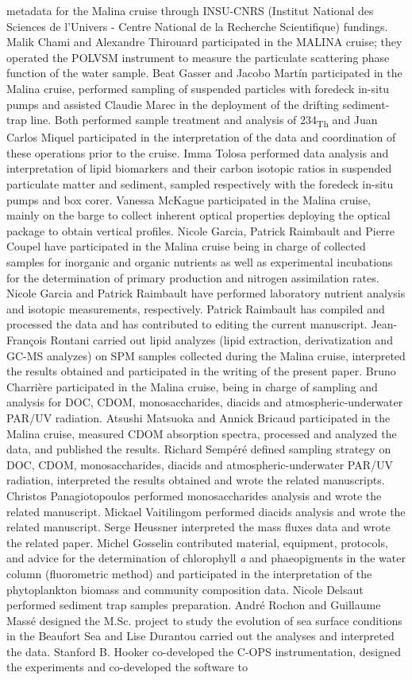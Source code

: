 \documentclass[essd, manuscript]{copernicus}
\begin{document}
{metadata for the Malina cruise through INSU-CNRS (Institut National des Sciences de l’Univers - Centre National de la Recherche Scientifique) fundings. Malik Chami and Alexandre Thirouard participated in the MALINA cruise; they operated the POLVSM instrument to measure the particulate scattering phase function of the water sample. Beat Gasser and Jacobo Martín participated in the Malina cruise, performed sampling of suspended particles with foredeck in-situ pumps and assisted Claudie Marec in the deployment of the drifting sediment-trap line. Both performed sample treatment and analysis of 234\textsubscript{Th} and Juan Carlos Miquel participated in the interpretation of the data and coordination of these  operations prior to the cruise. Imma Tolosa performed data analysis and interpretation of lipid biomarkers and their carbon isotopic ratios in suspended particulate matter and sediment, sampled respectively with the foredeck in-situ pumps and box corer. Vanessa McKague participated in the Malina cruise, mainly on the barge to collect inherent optical properties deploying the optical package to obtain vertical profiles. Nicole Garcia, Patrick Raimbault and Pierre Coupel have participated in the Malina cruise being in charge of collected samples for inorganic and organic nutrients as well as experimental incubations for the determination of primary production and nitrogen assimilation rates. Nicole Garcia and Patrick Raimbault have performed laboratory nutrient analysis and isotopic measurements, respectively. Patrick Raimbault has compiled and processed the data and has contributed to editing the current manuscript. Jean-François Rontani carried out lipid analyzes (lipid extraction, derivatization and GC-MS analyzes) on SPM samples collected during the Malina cruise, interpreted the results obtained and participated in the writing of the present paper. Bruno Charrière participated in the Malina cruise, being in charge of sampling and analysis for DOC, CDOM, monosaccharides, diacids and atmospheric-underwater PAR/UV radiation. Atsushi Matsuoka and Annick Bricaud participated in the Malina cruise, measured CDOM absorption spectra, processed and analyzed the data, and published the results. Richard Sempéré defined sampling strategy on DOC, CDOM, monosaccharides, diacids and atmospheric-underwater PAR/UV radiation, interpreted the results obtained and wrote the related manuscripts. Christos Panagiotopoulos performed monosaccharides analysis and wrote the related manuscript. Mickael Vaitilingom performed diacids analysis and wrote the related manuscript. Serge Heussner interpreted the mass fluxes data and wrote the related paper. Michel Gosselin contributed material, equipment, protocols, and advice for the determination of chlorophyll \textit{a} and phaeopigments in the water column (fluorometric method) and participated in the interpretation of the phytoplankton biomass and community composition data. Nicole Delsaut performed sediment trap samples preparation. André Rochon and Guillaume Massé designed the M.Sc. project to study the evolution of sea surface conditions in the Beaufort Sea and Lise Durantou carried out the analyses and interpreted the data. Stanford B. Hooker co-developed the C-OPS instrumentation, designed the experiments and co-developed the software to }
\end{document}
